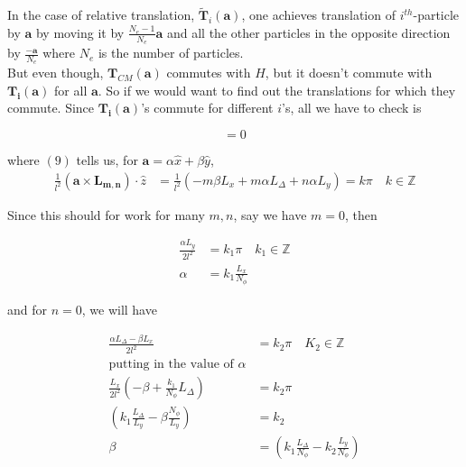 \documentclass[11pt,a4paper,notitlepage]{article}
\newcommand{\bsym}{\boldsymbol}
\newcommand{\cbrak}[1]{\left( #1 \right)}
\newcommand{\req}[1]{\text{eq}$( #1 )$}
\newcommand{\np}{N_{\phi}}
\newcommand{\ti}[2]{\bsym{T_{#1}}(\bsym{#2})}
\newcommand{\tcm}[1]{\bsym{T}_{CM}(\bsym{#1})}
\newcommand{\trel}[2]{\tilde{\bsym{T}}_{#1}(\bsym{#2})}
\begin{document}
                In the case of relative translation, $\trel{i}{a}$, one achieves translation of $i^{th}$-particle by $\bsym{a}$ by moving it by $\frac{N_{e}-1}{N_{e}}\bsym{a}$ and all the other particles in the opposite direction by $\frac{-\bsym{a}}{N_{e}}$ where $N_{e}$ is the number of particles.\\

                But even though, $\tcm{a}$ commutes with $H$, but it doesn't commute with $\ti{i}{a}$ for all $\bsym{a}$. So if we would want to find out the translations for which they commute. Since $\ti{i}{a}$'s commute for different $i$'s, all we have to check is

                \begin{equation*}
                  [\ti{i}{a},\ti{i}{L_{m,n}}] = 0
                \end{equation*}

                where \req{9} tells us, for $\bsym{a} = \alpha \hat{x} + \beta \hat{y} $,
                \begin{align*}
                  \frac{1}{l^2}(\bsym{a}\times \bsym{L_{m,n}})\cdot\hat{z} &= \frac{1}{l^2} (-m\beta L_{x} + m\alpha L_{\Delta}+n\alpha L_{y}) = k\pi\quad k\in\mathbb{Z}
                \end{align*}

                Since this should for work for many $m,n$, say we have $m=0$, then

                \begin{align*}
                  \frac{\alpha L_{y}}{2l^{2}} &= k_{1}\pi\quad k_{1}\in\mathbb{Z} \\
                  \alpha &= k_{1}\frac{L_{x}}{\np}
                \end{align*}

                and for $n=0$, we will have

                \begin{align*}
                  \frac{\alpha L_{\Delta} - \beta L_{x}}{2l^2} &= k_{2}\pi\quad K_{2}\in\mathbb{Z} \\
                  \text{putting in the value of }\alpha & \\
                  \frac{L_{x}}{2l^{2}}(-\beta + \frac{k_1}{\np}L_{\Delta}) &= k_2\pi \\
                  \cbrak{k_{1}\frac{L_{\Delta}}{L_{y}}-\beta\frac{\np}{L_{y}}} &= k_{2} \\
                  \beta & = \cbrak{k_{1}\frac{L_{\Delta}}{\np} - k_2\frac{L_y}{\np}}
                \end{align*}
\end{document}
